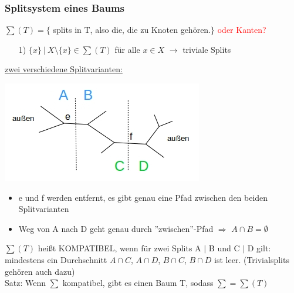 \newpage
\subsubsection{Splitsystem eines Baums}

$\sum (T) = \{$ splits in T, also die, die zu Knoten gehören.$\}$ \textcolor{red}{oder Kanten?}

\begin{enumerate}
	\item[1)] $ \{ x \}~|~X \setminus \{ x \} \in \sum (T)$ für alle $x \in X$ $\rightarrow$ triviale Splits
\end{enumerate}

\underline{zwei verschiedene Splitvarianten:}
\begin{center}
	\includegraphics[scale=1.25]{lectures/161209/pix/pic9.jpg}
\end{center}
\begin{itemize}
	\item e und f werden entfernt, es gibt genau eine Pfad zwischen den beiden Splitvarianten
	\item Weg von A nach D geht genau durch ''zwischen''-Pfad $\Rightarrow$ $A \cap B = \emptyset$
\end{itemize}

$\sum (T)$ heißt KOMPATIBEL, wenn für zwei Splits A $|$ B und C $|$ D gilt:\\
mindestens ein Durchschnitt $A \cap C$, $A \cap D$, $B \cap C$, $B \cap D$ ist leer. (Trivialsplits gehören auch dazu)\\

Satz: Wenn $\sum$ kompatibel, gibt es einen Baum T, sodass $\sum = \sum(T)$